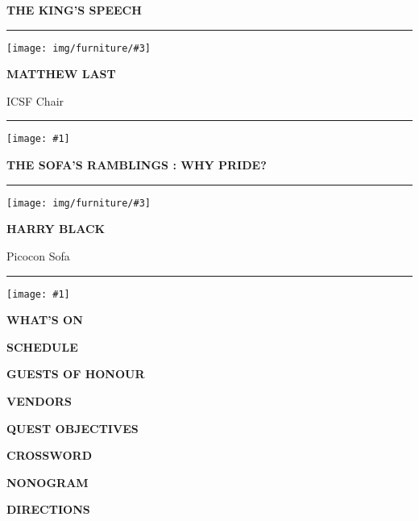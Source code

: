 \documentclass[12pt]{article}
\newcommand{\tombstone}[1]{%
  \texttt{[image: \#1]}%
}
\newcommand{\altf}[1]{{\robotocondensed\textbf{\uppercase{#1}}}}
\newcommand{\decorated}[1]{\altf{\textbullet{} #1 \textbullet{}}}
\newcommand{\head}[1]{%
  \begin{center}
    {\Huge\decorated{#1}}
  \end{center}%
}
\newcommand{\article}[3]{%
  \vspace{2.5em}\hrule
  \begin{center}
    \centering
  \begin{minipage}{0.15\textwidth}
    \texttt{[image: img/furniture/\#3]}
  \end{minipage}\hspace{1em}
  \begin{minipage}{0.3\textwidth}
    {\Large \altf{#1}\par}\vspace{-0.7\baselineskip} #2
  \end{minipage}
  \end{center}
  \vspace{1em}\hrule\vspace{1.5em}
  \tombstone{img/tombstone/sci-fi}
  \par\hfill
}
\begin{document}
%

\clearpage
%
\head{The King's Speech}
\article{Matthew Last}{ICSF Chair}{chair}
\clearpage

\head{The Sof{}a's Ramblings : Why Pride?}
\article{Harry Black}{Picocon Sofa}{sofa}
\clearpage
%
\head{What's On}

\clearpage
%
\head{Schedule}

\clearpage
%
\head{Guests of Honour}

\clearpage
%
\head{Vendors}

\clearpage
%
\head{Quest Objectives}


\clearpage
%
\head{Crossword}


\clearpage
%
\head{Nonogram}

\vfill

\vfill
\clearpage
%
\head{Directions}

%
\end{document}

